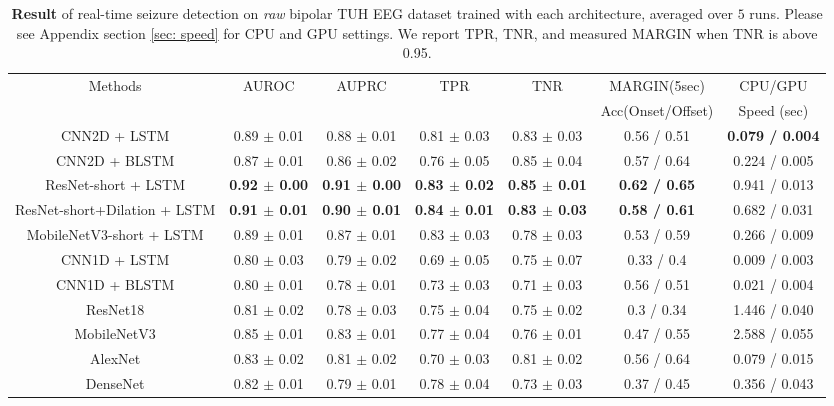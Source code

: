 \documentclass[pmlr,twocolumn,10pt]{jmlr}
\begin{document}
\begin{table*}[ht!]
	\tiny
	\centering
	\caption{\textbf{Result} of real-time seizure detection on \textit{raw} bipolar TUH EEG dataset trained with each architecture, averaged over $5$ runs. Please see Appendix section \ref{sec: speed} for CPU and GPU settings. We report TPR, TNR, and measured MARGIN when TNR is above 0.95.}
	\label{Result}
	\begin{tabular}{c|cccccc}
		\toprule
		Methods & AUROC & AUPRC & TPR & TNR & MARGIN(5sec)  &  CPU/GPU\\
		&&&&& Acc(Onset/Offset) & Speed (sec)\\
		\midrule
		CNN2D + LSTM &  0.89 $\pm$ 0.01  &  0.88 $\pm$ 0.01 &  0.81 $\pm$ 0.03  &  0.83 $\pm$ 0.03 & 0.56 / 0.51  & \textbf{0.079 / 0.004} \\
		CNN2D + BLSTM &  0.87 $\pm$ 0.01  &  0.86 $\pm$ 0.02  &  0.76 $\pm$ 0.05  &  0.85 $\pm$ 0.04 & 0.57 / 0.64  & 0.224 / 0.005 \\
	    ResNet-short + LSTM &  \textbf{0.92 $\pm$ 0.00}  &  \textbf{0.91 $\pm$ 0.00}  &  \textbf{0.83 $\pm$ 0.02}  &  \textbf{0.85 $\pm$ 0.01} & \textbf{0.62 / 0.65}  & 0.941 / 0.013 \\
		ResNet-short+Dilation + LSTM &  \textbf{0.91 $\pm$ 0.01} &  \textbf{0.90 $\pm$ 0.01} &  \textbf{0.84 $\pm$ 0.01} & \textbf{0.83 $\pm$ 0.03} & \textbf{0.58 / 0.61} & 0.682 / 0.031 \\
		MobileNetV3-short + LSTM &  0.89 $\pm$ 0.01  &  0.87 $\pm$ 0.01  &  0.83 $\pm$ 0.03  &  0.78 $\pm$ 0.03 & 0.53 / 0.59 & 0.266 / 0.009 \\
		\midrule
		CNN1D + LSTM &  0.80 $\pm$ 0.03  &  0.79 $\pm$ 0.02 &  0.69 $\pm$ 0.05  &  0.75 $\pm$ 0.07 & 0.33 / 0.4 & 0.009 / 0.003 \\
		CNN1D + BLSTM &  0.80 $\pm$ 0.01  &  0.78 $\pm$ 0.01 &  0.73 $\pm$ 0.03  &  0.71 $\pm$ 0.03 & 0.56 / 0.51  & 0.021 / 0.004 \\
		\midrule
        ResNet18 & 0.81 $\pm$ 0.02 & 0.78 $\pm$ 0.03 & 0.75 $\pm$ 0.04 & 0.75 $\pm$ 0.02 & 0.3 / 0.34 & 1.446 / 0.040   \\
		MobileNetV3 & 0.85 $\pm$ 0.01 & 0.83 $\pm$ 0.01 & 0.77 $\pm$ 0.04 & 0.76 $\pm$ 0.01 & 0.47 / 0.55 & 2.588 / 0.055   \\
		AlexNet & 0.83 $\pm$ 0.02 & 0.81 $\pm$ 0.02 & 0.70 $\pm$ 0.03 & 0.81 $\pm$ 0.02 & 0.56 / 0.64 & 0.079 / 0.015   \\
		DenseNet & 0.82 $\pm$ 0.01 & 0.79 $\pm$ 0.01 & 0.78 $\pm$ 0.04 & 0.73 $\pm$ 0.03 & 0.37 / 0.45 & 0.356 / 0.043   \\

\end{tabular}
\end{table*}
\end{document}
